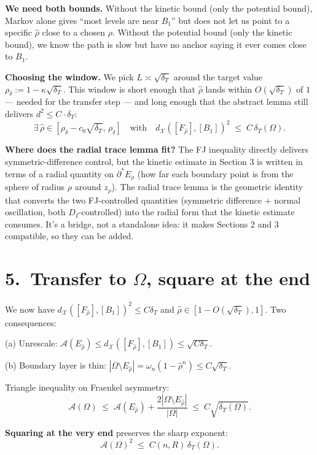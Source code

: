 \documentclass[11pt,a4paper]{article}
\newcommand{\X}{\mathcal{X}}
\newcommand{\Erho}{E_\rho}
\newcommand{\rhad}{\widehat{\rho}}
\newcommand{\rhodelta}{\rho_\delta}
\newcommand{\Fr}{\mathcal{A}}
\newcommand{\deltaT}{\delta_T}
\newcommand{\dX}{d_{\X}}
\begin{document}
\textbf{We need both bounds.} Without the kinetic bound (only the potential bound), Markov alone gives ``most levels are near $B_1$'' but does not let us point to a specific $\rhad$ close to a chosen $\rho$. Without the potential bound (only the kinetic bound), we know the path is slow but have no anchor saying it ever comes close to $B_1$.

\textbf{Choosing the window.} We pick $L \asymp \sqrt{\deltaT}$ around the target value $\rhodelta := 1 - \kappa\sqrt{\deltaT}$. This window is short enough that $\rhad$ lands within $O(\sqrt{\deltaT})$ of $1$ --- needed for the transfer step --- and long enough that the abstract lemma still delivers $d^2 \le C \cdot \deltaT$:
\[
\boxed{
\exists\, \rhad \in [\rhodelta - c_0\sqrt{\deltaT},\, \rhodelta] \quad \text{with} \quad
\dX([F_{\rhad}], [B_1])^2 \;\le\; C\,\deltaT(\Omega).
}
\]

\textbf{Where does the radial trace lemma fit?} The FJ inequality directly delivers symmetric-difference control, but the kinetic estimate in Section 3 is written in terms of a radial quantity on $\partial^* \Erho$ (how far each boundary point is from the sphere of radius $\rho$ around $z_\rho$). The radial trace lemma is the geometric identity that converts the two FJ-controlled quantities (symmetric difference + normal oscillation, both $D_I$-controlled) into the radial form that the kinetic estimate consumes. It's a bridge, not a standalone idea: it makes Sections 2 and 3 compatible, so they can be added.

\section*{5.\ Transfer to $\Omega$, square at the end}

We now have $\dX([F_{\rhad}], [B_1])^2 \le C \deltaT$ and $\rhad \in [1 - O(\sqrt{\deltaT}), 1]$. Two consequences:

(a) Unrescale: $\Fr(E_{\rhad}) \le \dX([F_{\rhad}], [B_1]) \le \sqrt{C\deltaT}$.

(b) Boundary layer is thin: $|\Omega \setminus E_{\rhad}| = \omega_n(1 - \rhad^n) \le C\sqrt{\deltaT}$.

Triangle inequality on Fraenkel asymmetry:
\[
\Fr(\Omega) \;\le\; \Fr(E_{\rhad}) + \frac{2|\Omega \setminus E_{\rhad}|}{|\Omega|}
\;\le\; C\sqrt{\deltaT(\Omega)}.
\]

\textbf{Squaring at the very end} preserves the sharp exponent:
\[
\boxed{\Fr(\Omega)^2 \;\le\; C(n, R)\, \deltaT(\Omega).}
\]
\end{document}
